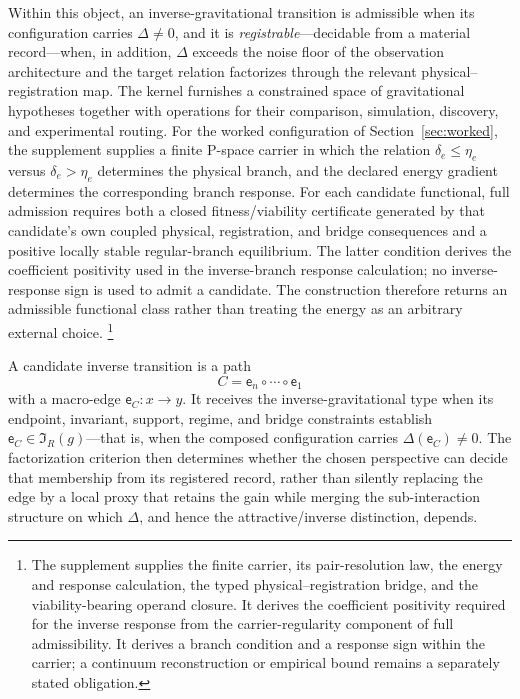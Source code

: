 \documentclass[10pt,twoside,a5paper]{article}
\newcommand{\Inv}{\ensuremath{\mathfrak I}}
\newcommand{\Edge}{\ensuremath{\mathsf e}}
\theoremstyle{definition}
\begin{document}
Within this object, an inverse-gravitational transition is admissible when its
configuration carries $\Delta\neq 0$, and it is \emph{registrable}---decidable from a
material record---when, in addition, $\Delta$ exceeds the noise floor of the
observation architecture and the target relation factorizes through the relevant
physical--registration map. The kernel furnishes a constrained space of gravitational
hypotheses together with operations for their comparison, simulation, discovery, and
experimental routing. For the worked configuration of Section~\ref{sec:worked}, the supplement
supplies a finite P-space carrier in which the relation
$\delta_e\leq\eta_e$ versus $\delta_e>\eta_e$ determines the physical branch,
and the declared energy gradient determines the corresponding branch response.
For each candidate functional, full admission requires both a closed
fitness/viability certificate generated by that candidate's own coupled
physical, registration, and bridge consequences and a positive locally stable
regular-branch equilibrium.  The latter condition derives the coefficient
positivity used in the inverse-branch response calculation; no inverse-response
sign is used to admit a candidate.  The construction therefore returns an
admissible functional class rather than treating the energy as an arbitrary
external choice.
\footnote{The supplement supplies the finite carrier, its pair-resolution law,
the energy and response calculation, the typed physical--registration bridge,
and the viability-bearing operand closure.  It derives the coefficient
positivity required for the inverse response from the carrier-regularity
component of full admissibility.  It derives a branch condition and a response
sign within the carrier; a continuum reconstruction or empirical bound remains
a separately stated obligation.}

A candidate inverse transition is a path
\begin{equation}
C=\Edge_n\circ\cdots\circ\Edge_1
\label{eq:gravity-composition}
\end{equation}
with a macro-edge $\Edge_C:x\to y$. It receives the inverse-gravitational type when
its endpoint, invariant, support, regime, and bridge constraints establish
$\Edge_C\in\Inv_R(g)$---that is, when the composed configuration carries
$\Delta(\Edge_C)\neq 0$. The factorization criterion then determines whether the chosen
perspective can decide that membership from its registered record, rather than silently
replacing the edge by a local proxy that retains the gain while merging the
sub-interaction structure on which $\Delta$, and hence the attractive/inverse
distinction, depends.
\end{document}
